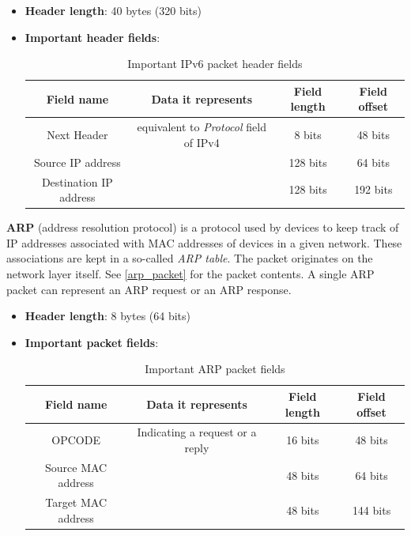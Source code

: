 \documentclass[a4paper]{article}
\begin{document}
  \begin{itemize}
    \item \textbf{Header length}: 40 bytes (320 bits)
    \item \textbf{Important header fields}:
      \begin{table}[h]
        \centering
        \begin{tabular}{|c|c|c|c|}
          \hline
          Field name & Data it represents & Field length & Field offset \\
          \hline
          \hline
          Next Header & equivalent to \textit{Protocol} field of IPv4 & 8 bits & 48 bits \\
          \hline
          Source IP address & & 128 bits & 64 bits \\
          \hline
          Destination IP address & & 128 bits & 192 bits \\
          \hline
        \end{tabular}
        \caption{Important IPv6 packet header fields}
      \end{table}
  \end{itemize}

  \vspace{1cm}


  \textbf{ARP} (address resolution protocol) is a protocol used by devices to 
  keep track of IP addresses associated with MAC addresses of devices in a 
  given network. These associations are kept in a so-called \textit{ARP table}.
  The packet originates on the network layer itself. See \ref{arp_packet} for
  the packet contents. A single ARP packet can represent an ARP request or an 
  ARP response.

  \begin{itemize}
    \item \textbf{Header length}: 8 bytes (64 bits)
    \item \textbf{Important packet fields}:
      \begin{table}[h]
        \centering
        \begin{tabular}{|c|c|c|c|}
          \hline
          Field name & Data it represents & Field length & Field offset \\
          \hline
          \hline
          OPCODE & Indicating a request or a reply & 16 bits & 48 bits \\
          \hline
          Source MAC address & & 48 bits & 64 bits \\
          \hline
          Target MAC address & & 48 bits & 144 bits \\
          \hline
        \end{tabular}
        \caption{Important ARP packet fields}
      \end{table}
  \end{itemize}
\end{document}
